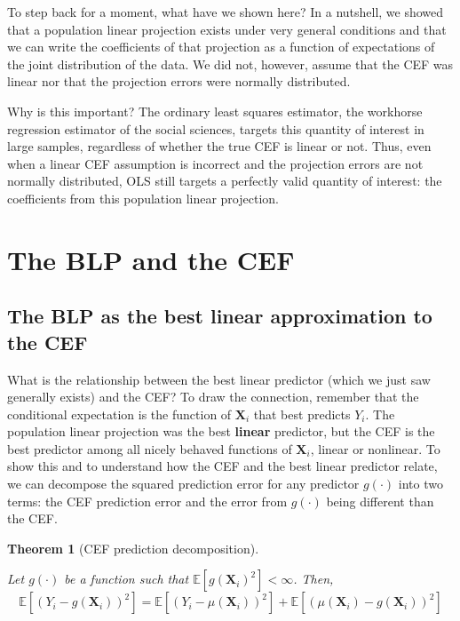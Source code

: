 \documentclass[
  13pt,
  letterpaper,
  DIV=11,
  numbers=noendperiod]{scrreprt}
\newcommand{\mb}{\bm}
\newcommand{\E}{\mathbb{E}}
\newcommand{\X}{\mb{X}}
\theoremstyle{plain}
\newtheorem{theorem}{Theorem}[chapter]
\theoremstyle{plain}
\theoremstyle{definition}
\theoremstyle{definition}
\theoremstyle{remark}
\begin{document}
To step back for a moment, what have we shown here? In a nutshell, we
showed that a population linear projection exists under very general
conditions and that we can write the coefficients of that projection as
a function of expectations of the joint distribution of the data. We did
not, however, assume that the CEF was linear nor that the projection
errors were normally distributed.

Why is this important? The ordinary least squares estimator, the
workhorse regression estimator of the social sciences, targets this
quantity of interest in large samples, regardless of whether the true
CEF is linear or not. Thus, even when a linear CEF assumption is
incorrect and the projection errors are not normally distributed, OLS
still targets a perfectly valid quantity of interest: the coefficients
from this population linear projection.

\section{The BLP and the CEF}\label{the-blp-and-the-cef}

\subsection{The BLP as the best linear approximation to the
CEF}\label{the-blp-as-the-best-linear-approximation-to-the-cef}

What is the relationship between the best linear predictor (which we
just saw generally exists) and the CEF? To draw the connection, remember
that the conditional expectation is the function of \(\X_i\) that best
predicts \(Y_{i}\). The population linear projection was the best
\textbf{linear} predictor, but the CEF is the best predictor among all
nicely behaved functions of \(\X_{i}\), linear or nonlinear. To show
this and to understand how the CEF and the best linear predictor relate,
we can decompose the squared prediction error for any predictor
\(g(\cdot)\) into two terms: the CEF prediction error and the error from
\(g(\cdot)\) being different than the CEF.

\begin{theorem}[CEF prediction
decomposition]\protect\hypertarget{thm-cef-blp-decomposition}{}\label{thm-cef-blp-decomposition}

Let \(g(\cdot)\) be a function such that \(\E[g(\X_{i})^{2}] < \infty\).
Then, \[
\E\left[(Y_{i} - g(\X_{i}))^{2}\right] = \E\left[(Y_i - \mu(\X_i))^2\right] + \E\left[(\mu(\X_i) - g(\X_i))^2\right]
\]

\end{theorem}
\end{document}
